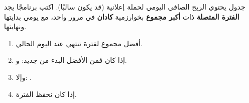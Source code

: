 \clearpage
{}

\begin{statement}
جدول  يحتوي الربح الصافي اليومي لحملة إعلانية (قد يكون سالبًا). اكتب برنامجًا يجد \textbf{الفترة المتصلة} ذات \textbf{أكبر مجموع} بخوارزمية \textbf{كادان} في مرور واحد، مع يومي بدايتها ونهايتها.
\end{statement}
\begin{stepsbox}\begin{enumerate}
\item {} أفضل مجموع لفترة تنتهي عند اليوم الحالي.
\item إذا كان  فمن الأفضل البدء من جديد:  و.
\item وإلا: .
\item إذا كان  نحفظ الفترة.
\end{enumerate}\end{stepsbox}
